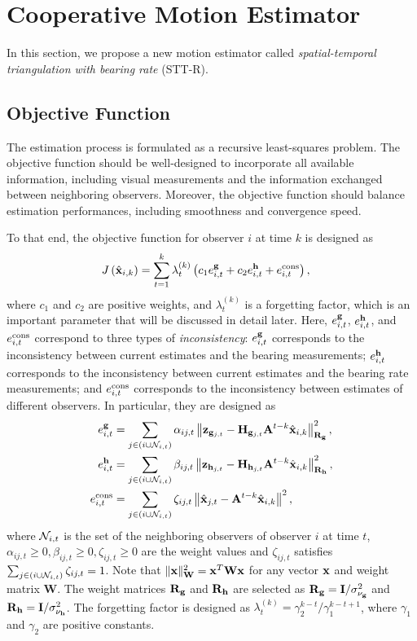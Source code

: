\documentclass[letterpaper, 10 pt, conference]{ieeeconf}  %
\begin{document}
\section{Cooperative Motion Estimator}\label{sec_STT_R}

In this section, we propose a new motion estimator called \emph{spatial-temporal triangulation with bearing rate} (STT-R).

\subsection{Objective Function}

The estimation process is formulated as a recursive least-squares problem.
The objective function should be well-designed to incorporate all available information, including visual measurements and the information exchanged between neighboring observers. Moreover, the objective function should balance estimation performances, including smoothness and convergence speed.

To that end, the objective function for observer $i$ at time $k$ is designed as
\begin{align}
&J\left(\hat{\mathbf{x}}_{i,k}\right) =\sum_{t=1}^{k}\lambda_t^{(k)}\left(c_1e^{\mathbf{g}}_{i,t}+c_2e^{\mathbf{h}}_{i,t} + e^{\rm cons}_{i,t}\right), \label{eq_J_x_k}
\end{align}
where $c_1$ and $c_2$ are positive weights, and $\lambda_t^{(k)}$ is a forgetting factor, which is an important parameter that will be discussed in detail later.
Here, $e^{\mathbf{g}}_{i,t}$, $e^{\mathbf{h}}_{i,t}$, and $e^{\rm cons}_{i,t}$ correspond to three types of \emph{inconsistency}: $e^{\mathbf{g}}_{i,t}$ corresponds to the inconsistency between current estimates and the bearing measurements; $e^{\mathbf{h}}_{i,t}$ corresponds to the inconsistency between current estimates and the bearing rate measurements; and $e^{\rm cons}_{i,t}$ corresponds to the inconsistency between estimates of different observers.
In particular, they are designed as
\begin{align}
e^{\mathbf{g}}_{i,t} & =\sum_{j\in(i\cup \mathcal{N}_{i,t})}\alpha_{ij, t}\left\|\mathbf{z}_{\mathbf{g}_{j, t}} - \mathbf{H}_{\mathbf{g}_{j, t}}\mathbf{A}^{t-k}\hat{\mathbf{x}}_{i,k}\right\|^2_{\mathbf{R}_{\mathbf{g}}}, \\
e^{\mathbf{h}}_{i,t} & = \sum_{j\in(i\cup \mathcal{N}_{i,t})} \beta_{ij, t}\left\|\mathbf{z}_{\mathbf{h}_{j, t}} - \mathbf{H}_{\mathbf{h}_{j, t}}\mathbf{A}^{t-k}\hat{\mathbf{x}}_{i,k}\right\|^2_{\mathbf{R}_{\mathbf{h}}}, \\
e^{\rm cons}_{i,t} & = \sum_{j\in(i\cup \mathcal{N}_{i,t})} \zeta_{ij, t}\left\|\hat{\mathbf{x}}_{j, t} - \mathbf{A}^{t-k}\hat{\mathbf{x}}_{i,k}\right\|^2,
\end{align}
where $\mathcal{N}_{i,t}$ is the set of the neighboring observers of observer $i$ at time $t$, $\alpha_{ij, t}\geq 0, \beta_{ij, t}\geq 0, \zeta_{ij, t}\geq 0$ are the weight values and $\zeta_{ij, t}$ satisfies $\sum_{j\in(i\cup\mathcal{N}_{i,t})}\zeta_{ij, t} = 1$.
Note that $\|\mathbf{x}\|^2_\mathbf{W}=\mathbf{x}^T\mathbf{W}\mathbf{x}$ for any vector $\mathbf{x}$ and weight matrix $\mathbf{W}$. The weight matrices $\mathbf{R}_{\mathbf{g}}$ and $\mathbf{R}_{\mathbf{h}}$ are selected as $\mathbf{R}_{\mathbf{g}} = \mathbf{I}/\sigma_{\nu_{\mathbf{g}}}^2$ and $\mathbf{R}_{\mathbf{h}} = \mathbf{I}/\sigma_{\nu_{\mathbf{h}}}^2$.
The forgetting factor is designed as \(\lambda_t^{(k)} = \gamma_2^{k-t}/\gamma_1^{k-t+1}\),
where $\gamma_1$ and $\gamma_2$ are positive constants.
\end{document}
